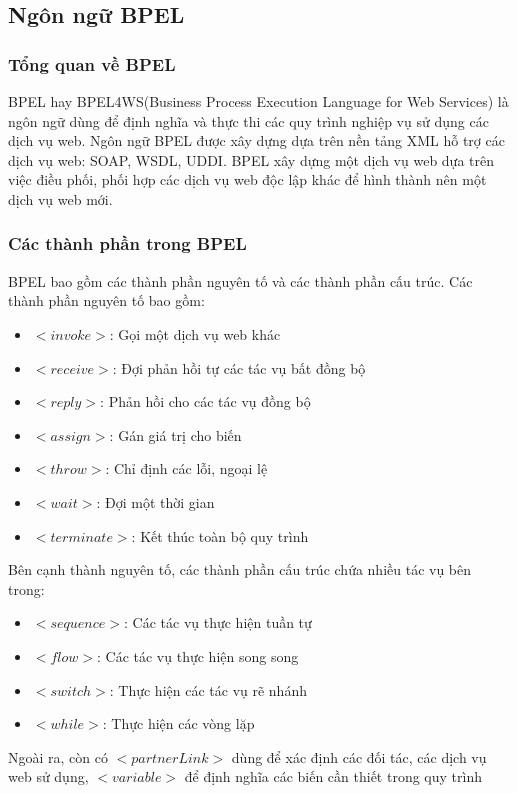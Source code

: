 \subsection{Ngôn ngữ BPEL}
\subsubsection{Tổng quan về BPEL}
\hspace*{0.5cm} BPEL hay BPEL4WS(Business Process Execution Language for Web Services) là ngôn ngữ dùng để định nghĩa và thực thi các quy trình nghiệp vụ sử dụng các dịch vụ web. Ngôn ngữ BPEL được xây dựng dựa trên nền tảng XML hỗ trợ các dịch vụ web: SOAP, WSDL, UDDI. BPEL xây dựng một dịch vụ web dựa trên việc điều phối, phối hợp các dịch vụ web độc lập khác để hình thành nên một dịch vụ web mới.
\subsubsection{Các thành phần trong BPEL}
BPEL bao gồm các thành phần nguyên tố và các thành phần cấu trúc. Các thành phần nguyên tố bao gồm:
\begin{itemize}
	\item $<invoke>$: Gọi một dịch vụ web khác
	\item $<receive>$: Đợi phản hồi tự các tác vụ bất đồng bộ
	\item $<reply>$: Phản hồi cho các tác vụ đồng bộ
	\item $<assign>$: Gán giá trị cho biến
	\item $<throw>$: Chỉ định các lỗi, ngoại lệ
	\item $<wait>$: Đợi một thời gian
	\item $<terminate>$: Kết thúc toàn bộ quy trình
\end{itemize}

Bên cạnh thành nguyên tố, các thành phần cấu trúc chứa nhiều tác vụ bên trong:
\begin{itemize}
    \item $<sequence>$: Các tác vụ thực hiện tuần tự
    \item $<flow>$: Các tác vụ thực hiện song song
    \item $<switch>$: Thực hiện các tác vụ rẽ nhánh
    \item $<while>$: Thực hiện các vòng lặp
\end{itemize}
 
Ngoài ra, còn có $<partnerLink>$ dùng để xác định các đối tác, các dịch vụ web sử dụng, $<variable>$ để định nghĩa các biến cần thiết trong quy trình


